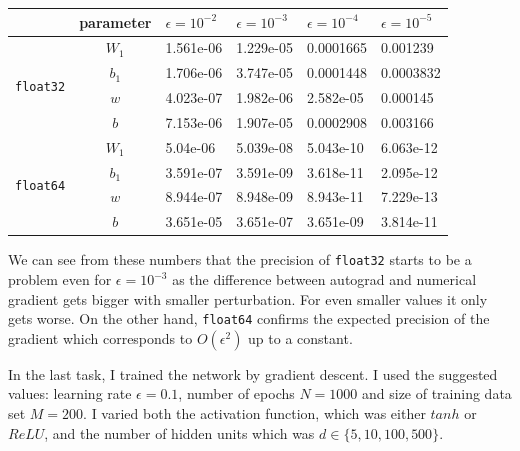 \documentclass[a4paper,11pt]{article}
\begin{document}
\begin{table}[ht]
    \centering
    \begin{tabular}{ r | c | l | l | l | l }
                                          & parameter & $\epsilon = 10^{-2}$ & $\epsilon = 10^{-3}$ & $\epsilon = 10^{-4}$ & $\epsilon = 10^{-5}$ \\
        \hline
        \multirow{4}{*}{\texttt{float32}} & $W_1$     & 1.561e-06            & 1.229e-05            & 0.0001665            & 0.001239             \\
                                          & $b_1$     & 1.706e-06            & 3.747e-05            & 0.0001448            & 0.0003832            \\
                                          & $w$       & 4.023e-07            & 1.982e-06            & 2.582e-05            & 0.000145             \\
                                          & $b$       & 7.153e-06            & 1.907e-05            & 0.0002908            & 0.003166             \\
        \hline
        \multirow{4}{*}{\texttt{float64}} & $W_1$     & 5.04e-06             & 5.039e-08            & 5.043e-10            & 6.063e-12            \\
                                          & $b_1$     & 3.591e-07            & 3.591e-09            & 3.618e-11            & 2.095e-12            \\
                                          & $w$       & 8.944e-07            & 8.948e-09            & 8.943e-11            & 7.229e-13            \\
                                          & $b$       & 3.651e-05            & 3.651e-07            & 3.651e-09            & 3.814e-11            \\
    \end{tabular}
\end{table}

We can see from these numbers that the precision of \texttt{float32} starts to be a problem even for $\epsilon = 10^{-3}$ as the difference between autograd and numerical gradient gets bigger with smaller perturbation.
For even smaller values it only gets worse.
On the other hand, \texttt{float64} confirms the expected precision of the gradient which corresponds to $O(\epsilon^2)$ up to a constant.

In the last task, I trained the network by gradient descent.
I used the suggested values: learning rate $\epsilon = 0.1$, number of epochs $N = 1000$ and size of training data set $M = 200$.
I varied both the activation function, which was either $tanh$ or $ReLU$, and the number of hidden units which was $d \in \{5, 10, 100, 500\}$.
\end{document}
